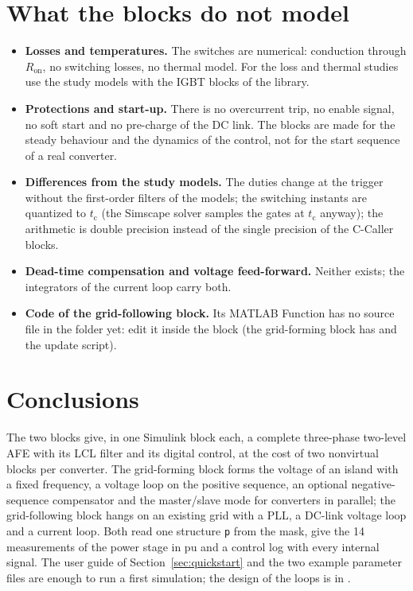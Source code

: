 \documentclass[11pt,a4paper]{scrartcl}
\newcommand{\ped}[1]{_{\mathrm{#1}}}
\newcommand{\code}[1]{\texttt{#1}}
\begin{document}
\begin{onehalfspace}
\section{What the blocks do not model}
\label{sec:limits}

\begin{itemize}[nosep]
	\item \textbf{Losses and temperatures.} The switches are numerical: conduction through $R\ped{on}$, no switching losses, no thermal model. For the loss and thermal studies use the study models with the IGBT blocks of the library.
	\item \textbf{Protections and start-up.} There is no overcurrent trip, no enable signal, no soft start and no pre-charge of the DC link. The blocks are made for the steady behaviour and the dynamics of the control, not for the start sequence of a real converter.
	\item \textbf{Differences from the study models.} The duties change at the trigger without the first-order filters of the models; the switching instants are quantized to $t\ped{c}$ (the Simscape solver samples the gates at $t\ped{c}$ anyway); the arithmetic is double precision instead of the single precision of the C-Caller blocks.
	\item \textbf{Dead-time compensation and voltage feed-forward.} Neither exists; the integrators of the current loop carry both.
	\item \textbf{Code of the grid-following block.} Its MATLAB Function has no source file in the folder yet: edit it inside the block (the grid-forming block has  and the update script).
\end{itemize}

\section{Conclusions}
\label{sec:conclusions}

The two blocks give, in one Simulink block each, a complete three-phase two-level AFE with its LCL filter and its digital control, at the cost of two nonvirtual blocks per converter. The grid-forming block forms the voltage of an island with a fixed frequency, a voltage loop on the positive sequence, an optional negative-sequence compensator and the master/slave mode for converters in parallel; the grid-following block hangs on an existing grid with a PLL, a DC-link voltage loop and a current loop. Both read one structure \code{p} from the mask, give the 14 measurements of the power stage in pu and a control log with every internal signal. The user guide of Section~\ref{sec:quickstart} and the two example parameter files are enough to run a first simulation; the design of the loops is in \cite{gfm_note}.


\end{onehalfspace}
\end{document}
